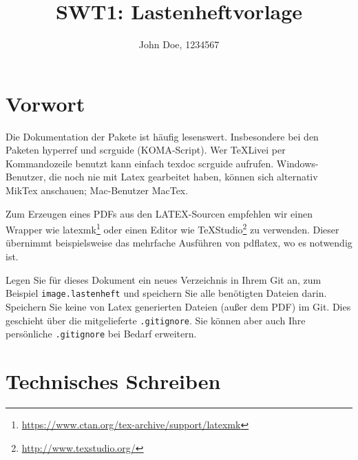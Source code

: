 \documentclass[parskip=full]{scrartcl}
\title{SWT1: Lastenheftvorlage}
\author{John Doe, 1234567}
\begin{document}
\maketitle

%
%
\section{Vorwort}
Die Dokumentation der Pakete ist häufig lesenswert.
Insbesondere bei den Paketen hyperref und scrguide (KOMA-Script).
Wer TeXLivei per Kommandozeile benutzt kann einfach texdoc scrguide aufrufen.
Windows-Benutzer, die noch nie mit Latex gearbeitet haben, können sich alternativ MikTex anschauen; Mac-Benutzer MacTex.

Zum Erzeugen eines PDFs aus den LATEX-Sourcen empfehlen wir einen Wrapper wie latexmk\footnote{\url{https://www.ctan.org/tex-archive/support/latexmk}} oder einen Editor wie TeXStudio\footnote{\url{http://www.texstudio.org/}} zu verwenden.
Dieser übernimmt beispielsweise das mehrfache Ausführen von pdflatex, wo es notwendig ist.

Legen Sie für dieses Dokument ein neues Verzeichnis in Ihrem Git an, zum Beispiel \texttt{image.lastenheft} und speichern Sie alle benötigten Dateien darin.
Speichern Sie keine von Latex generierten Dateien (außer dem PDF) im Git.
Dies geschieht über die mitgelieferte \texttt{.gitignore}.
Sie können aber auch Ihre persönliche \texttt{.gitignore} bei Bedarf erweitern.

\section{Technisches Schreiben}
\end{document}
